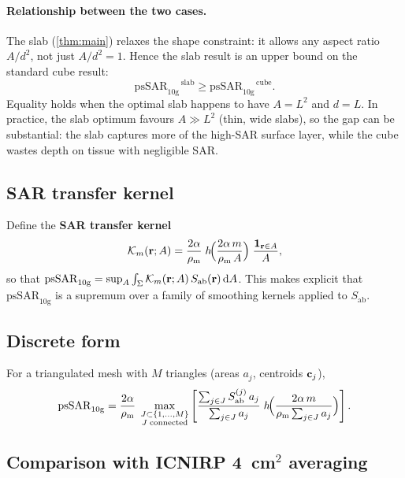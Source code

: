 \documentclass[11pt,a4paper]{article}
\theoremstyle{definition}
\theoremstyle{remark}
\newcommand{\Sab}{S_{\mathrm{ab}}}
\newcommand{\psSAR}{\ensuremath{\mathrm{psSAR}_{10\mathrm{g}}}}
\newcommand{\rhom}{\rho_{\mathrm{m}}}
\begin{document}
\paragraph{Relationship between the two cases.}
The slab (\cref{thm:main}) relaxes the shape constraint: it allows any
aspect ratio $A/d^2$, not just $A/d^2 = 1$.  Hence the slab result is an
upper bound on the standard cube result:
\begin{equation}\label{eq:slab-geq-cube}
  \psSAR^{\,\mathrm{slab}} \geq \psSAR^{\,\mathrm{cube}}.
\end{equation}
Equality holds when the optimal slab happens to have $A = L^2$ and $d = L$.
In practice, the slab optimum favours $A \gg L^2$ (thin, wide slabs),
so the gap can be substantial: the slab captures more of the high-SAR
surface layer, while the cube wastes depth on tissue with negligible SAR.

\subsection{SAR transfer kernel}

Define the \textbf{SAR transfer kernel}
\begin{equation}\label{eq:kernel}
  \mathcal{K}_m(\vb{r}; A)
  = \frac{2\alpha}{\rhom}\;
    h\!\Bigl(\frac{2\alpha\,m}{\rhom\,A}\Bigr)\;
    \frac{\mathbf{1}_{\vb{r} \in A}}{A},
\end{equation}
so that $\psSAR = \sup_A \int_\Sigma \mathcal{K}_m(\vb{r};A)\,\Sab(\vb{r})\,\mathrm{d}A$.
This makes explicit that $\psSAR$ is a supremum over a family of smoothing
kernels applied to $\Sab$.

\subsection{Discrete form}

For a triangulated mesh with $M$ triangles (areas $a_j$, centroids $\vb{c}_j$),
\begin{equation}\label{eq:discrete}
  \psSAR
  = \frac{2\alpha}{\rhom}\;
    \max_{\substack{J \subset \{1,\ldots,M\} \\ J\;\text{connected}}}
    \left[
      \frac{\sum_{j \in J} \Sab^{(j)}\,a_j}{\sum_{j \in J} a_j}\;
      h\!\Bigl(\frac{2\alpha\,m}{\rhom\sum_{j \in J}a_j}\Bigr)
    \right].
\end{equation}

\subsection{Comparison with ICNIRP 4~cm\texorpdfstring{$^2$}{2} averaging}
\end{document}

